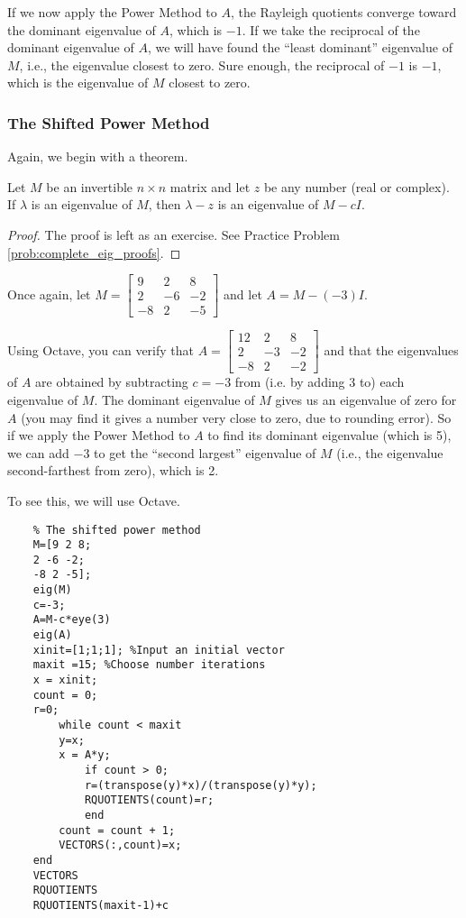\documentclass{ximera}
\begin{document}
If we now apply the Power Method to $A$, the Rayleigh quotients converge toward the dominant eigenvalue of $A$, which is $-1$.  If we take the reciprocal of the dominant eigenvalue of $A$, we will have found the ``least dominant'' eigenvalue of $M$, i.e., the eigenvalue closest to zero.  Sure enough, the reciprocal of $-1$ is $-1$, which is the eigenvalue of $M$ closest to zero.


\subsubsection*{The Shifted Power Method}
Again, we begin with a theorem.

\begin{theorem}\label{th:eig_shifted}
Let $M$ be an invertible $n \times n$ matrix and let $z$ be any number (real or complex).  If $\lambda$ is an eigenvalue of $M$, then $\lambda - z$ is an eigenvalue of $M - cI$.
\end{theorem}

\begin{proof}
The proof is left as an exercise.  See Practice Problem \ref{prob:complete_eig_proofs}.
\end{proof}

Once again, let $M=\left[ \begin{array}{rrr}
9 & 2 & 8 \\
2 & -6 & -2 \\
-8 & 2 & -5
\end{array}\right]$ and let $A=M - (-3)I$.

Using Octave, you can verify that $A=\left[ \begin{array}{rrr}
12 & 2 & 8 \\
2 & -3 & -2 \\
-8 & 2 & -2
\end{array}\right]$ and that the eigenvalues of $A$ are obtained by subtracting $c=-3$ from (i.e. by adding 3 to) each eigenvalue of $M$.  The dominant eigenvalue of $M$ gives us an eigenvalue of zero for $A$ (you may find it gives a number very close to zero, due to rounding error).  So if we apply the Power Method to $A$ to find its dominant eigenvalue (which is 5), we can add $-3$ to get the ``second largest'' eigenvalue of $M$ (i.e., the eigenvalue second-farthest from zero), which is 2.

To see this, we will use Octave.

\begin{verbatim}
    % The shifted power method
    M=[9 2 8; 
    2 -6 -2; 
    -8 2 -5];
    eig(M)
    c=-3;
    A=M-c*eye(3) 
    eig(A)
    xinit=[1;1;1]; %Input an initial vector
    maxit =15; %Choose number iterations
    x = xinit;
    count = 0;
    r=0;
        while count < maxit
        y=x;
        x = A*y;
            if count > 0; 
            r=(transpose(y)*x)/(transpose(y)*y);
            RQUOTIENTS(count)=r;
            end
        count = count + 1;
        VECTORS(:,count)=x;
    end
    VECTORS
    RQUOTIENTS
    RQUOTIENTS(maxit-1)+c
\end{verbatim}
\end{document}
